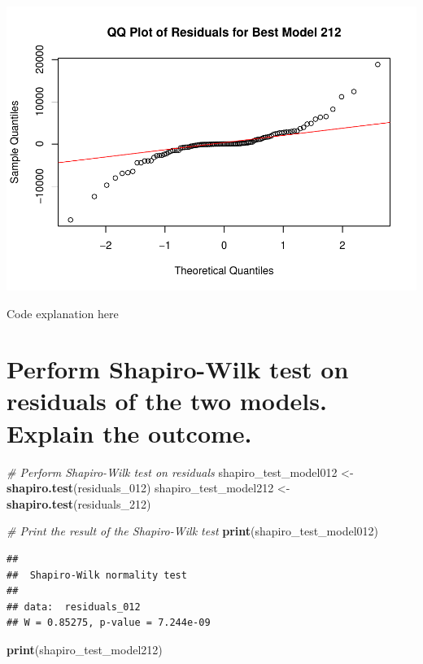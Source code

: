 \documentclass[
]{book}
\newenvironment{Shaded}{\begin{snugshade}}{\end{snugshade}}
\newcommand{\CommentTok}[1]{\textcolor[rgb]{0.56,0.35,0.01}{\textit{#1}}}
\newcommand{\FunctionTok}[1]{\textcolor[rgb]{0.13,0.29,0.53}{\textbf{#1}}}
\newcommand{\NormalTok}[1]{#1}
\newcommand{\OtherTok}[1]{\textcolor[rgb]{0.56,0.35,0.01}{#1}}
\begin{document}
\includegraphics{bookdown-demo_files/figure-latex/unnamed-chunk-51-2.pdf}

Code explanation here

\section{Perform Shapiro-Wilk test on residuals of the two models. Explain the outcome.}\label{perform-shapiro-wilk-test-on-residuals-of-the-two-models.-explain-the-outcome.}

\begin{Shaded}
\begin{Highlighting}[]
\CommentTok{\# Perform Shapiro{-}Wilk test on residuals}
\NormalTok{shapiro\_test\_model012 }\OtherTok{\textless{}{-}} \FunctionTok{shapiro.test}\NormalTok{(residuals\_012)}
\NormalTok{shapiro\_test\_model212 }\OtherTok{\textless{}{-}} \FunctionTok{shapiro.test}\NormalTok{(residuals\_212)}

\CommentTok{\# Print the result of the Shapiro{-}Wilk test}
\FunctionTok{print}\NormalTok{(shapiro\_test\_model012)}
\end{Highlighting}
\end{Shaded}

\begin{verbatim}
## 
##  Shapiro-Wilk normality test
## 
## data:  residuals_012
## W = 0.85275, p-value = 7.244e-09
\end{verbatim}

\begin{Shaded}
\begin{Highlighting}[]
\FunctionTok{print}\NormalTok{(shapiro\_test\_model212)}
\end{Highlighting}
\end{Shaded}
\end{document}
